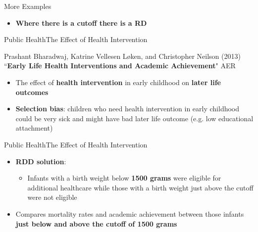 \documentclass[hyperref={pdfpagelabels=false}]{beamer}
\begin{document}
\begin{frame}{More Examples}{}
\begin{itemize}

\item \textbf{Where there is a cutoff there is a RD}

\end{itemize}
\end{frame}




\begin{frame}{Public Health}{The Effect of Health Intervention}

Prashant Bharadwaj, Katrine Vellesen Løken, and
Christopher Neilson (2013) ``\textbf{Early Life Health Interventions and Academic Achievement}" AER

\begin{itemize}

\item The effect of \textbf{health intervention} in early childhood on \textbf{later life outcomes}
\vspace{0.2cm}
\item \textbf{Selection bias}: children who need health intervention in early childhood could be very sick and might have bad later life outcome (e.g. low educational attachment)

\end{itemize}
\end{frame}




\begin{frame}{Public Health}{The Effect of Health Intervention}
\begin{itemize}


\item \textbf{RDD solution}: 
\vspace{0.2cm}
\begin{itemize}
\item Infants with a birth weight below \textbf{1500 grams} were eligible for additional healthcare while those with a birth weight just above the cutoff were not eligible
\vspace{0.2cm}
\end{itemize}
\item Compares mortality rates and academic achievement between those infants \textbf{just below and above the cutoff of 1500 grams} 
\end{itemize}
\end{frame}
\end{document}
